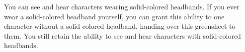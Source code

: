 \documentclass[green]{Kos}
\begin{document}
\name{\gWhisperer{}}

You can see and hear characters wearing solid-colored headbands. If you ever wear a solid-colored headband yourself, you can grant this ability to one character without a solid-colored headband, handing over this greensheet to them. You still retain the ability to see and hear characters with solid-colored headbands.
\end{document}
